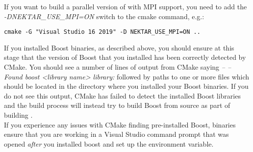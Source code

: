 \begin{enumerate}
  If you want to build a parallel version of \nekpp with MPI support, you need
  to add the \emph{-DNEKTAR\_USE\_MPI=ON} switch to the cmake command, e.g.:
  \begin{lstlisting}[style=BashInputStyle]
    cmake -G "Visual Studio 16 2019" -D NEKTAR_USE_MPI=ON ..
  \end{lstlisting}

  \begin{notebox}
  If you installed Boost binaries, as described above, you should ensure at
  this stage that the version of Boost that you installed has been correctly
  detected by CMake. You should see a number of lines of output from CMake
  saying \emph{-- -- Found boost <library name> library: } followed by paths to
  one or more files which should be located in the directory where you
  installed your Boost binaries. If you do not see this output, CMake has
  failed to detect the installed Boost libraries and the build process will
  instead try to build Boost from source as part of building \nekpp.\\

  If you experience any issues with CMake finding pre-installed Boost, binaries
  ensure that you are working in a Visual Studio command prompt that was
  opened \emph{after} you installed boost and set up the 
  environment variable.
  \end{notebox}


\end{enumerate}
